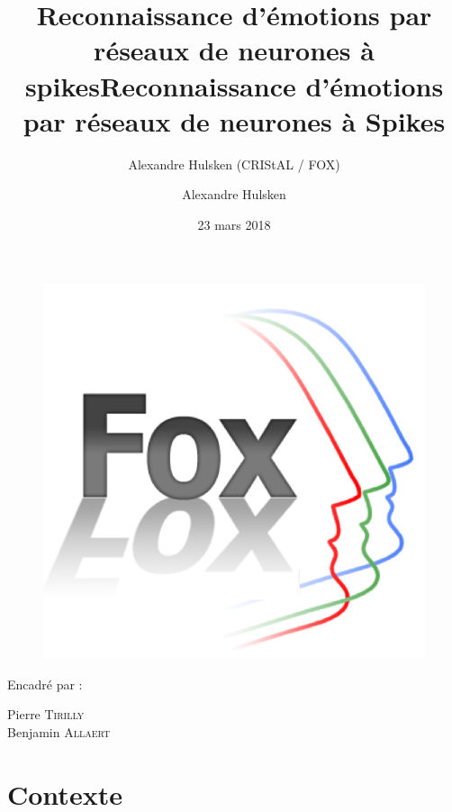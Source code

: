 \documentclass{beamer}
\author{Alexandre Hulsken (CRIStAL / FOX)}
\title{Reconnaissance d'émotions par réseaux de neurones à spikes}
\title[Label Recherche]{Reconnaissance d’émotions par réseaux de neurones à Spikes}
\author{Alexandre Hulsken}
\institute[IRCICA/FOX]
{
Université des Sciences et Technologies de Lille \\
\medskip
}
\date{23 mars 2018}
\begin{document}
\begin{frame}
\titlepage
\begin{figure}
\includegraphics[scale=0.07]{image/logoFOX.png}
\end{figure}
\vfill
Encadré par :\par
Pierre \textsc{Tirilly} \\
Benjamin \textsc{Allaert}
\end{frame}


\section{Contexte}
\end{document}
